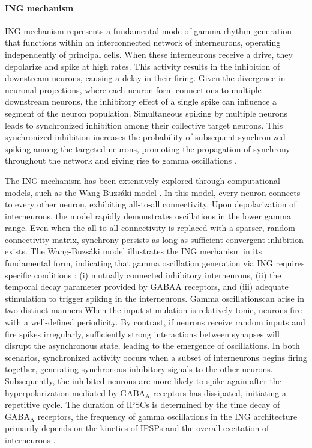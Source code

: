 \documentclass[../main.tex]{subfiles}
\begin{document}
\paragraph{ING mechanism}
ING mechanism represents a fundamental mode of gamma rhythm generation that functions within an interconnected network of interneurons, operating independently of principal cells.
When these interneurons receive a drive, they depolarize and spike at high rates.
This activity results in the inhibition of downstream neurons, causing a delay in their firing.
Given the divergence in neuronal projections, where each neuron form connections to multiple downstream neurons, the inhibitory effect of a single spike can influence a segment of the neuron population. 
Simultaneous spiking by multiple neurons leads to synchronized inhibition among their collective target neurons.
This synchronized inhibition increases the probability of subsequent synchronized spiking among the targeted neurons, promoting the propagation of synchrony throughout the network and giving rise to gamma oscillations \citep{jaeger_hippocampal_2013,cutsuridis_computational_2015}.

The ING mechanism has been extensively explored through computational models, such as the Wang-Buzsáki model \citep{Wang1996}. 
In this model, every neuron connects to every other neuron, exhibiting all-to-all connectivity. 
Upon depolarization of interneurons, the model rapidly demonstrates oscillations in the lower gamma range.
Even when the all-to-all connectivity is replaced with a sparser, random connectivity matrix, synchrony persists as long as sufficient convergent inhibition exists.
The Wang-Buzsáki model illustrates the ING mechanism in its fundamental form, indicating that gamma oscillation generation via ING requires specific conditions \citep{buzsaki2012mechanisms}:
(i) mutually connected inhibitory interneurons, (ii) the temporal decay parameter provided by GABAA receptors, and (iii) adequate stimulation to trigger spiking in the interneurons.
Gamma oscillationscan arise in two distinct manners
When the input stimulation is relatively tonic, neurons fire with a well-defined periodicity.
By contrast, if neurons receive random inputs and fire spikes irregularly, sufficiently strong interactions between synapses will disrupt the asynchronous state, leading to the emergence of oscillations.
In both scenarios, synchronized activity occurs when a subset of interneurons begins firing together, generating synchronous inhibitory signals to the other neurons. Subsequently, the inhibited neurons are more likely to spike again after the hyperpolarization mediated by GABA$_\text{A}$ receptors has dissipated, initiating a repetitive cycle.
The duration of IPSCs is determined by the time decay of GABA$_\text{A}$ receptors, the frequency of gamma oscillations in the ING architecture primarily depends on the kinetics of IPSPs and the overall excitation of interneurons \citep{buzsaki2012mechanisms}.
\end{document}
